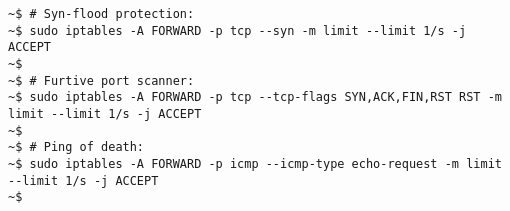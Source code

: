 \documentclass[varwidth=51em]{standalone}
\begin{document}
\begin{verbatim}
~$ # Syn-flood protection:
~$ sudo iptables -A FORWARD -p tcp --syn -m limit --limit 1/s -j ACCEPT
~$
~$ # Furtive port scanner:
~$ sudo iptables -A FORWARD -p tcp --tcp-flags SYN,ACK,FIN,RST RST -m limit --limit 1/s -j ACCEPT
~$
~$ # Ping of death:
~$ sudo iptables -A FORWARD -p icmp --icmp-type echo-request -m limit --limit 1/s -j ACCEPT
~$
\end{verbatim}
\end{document}
